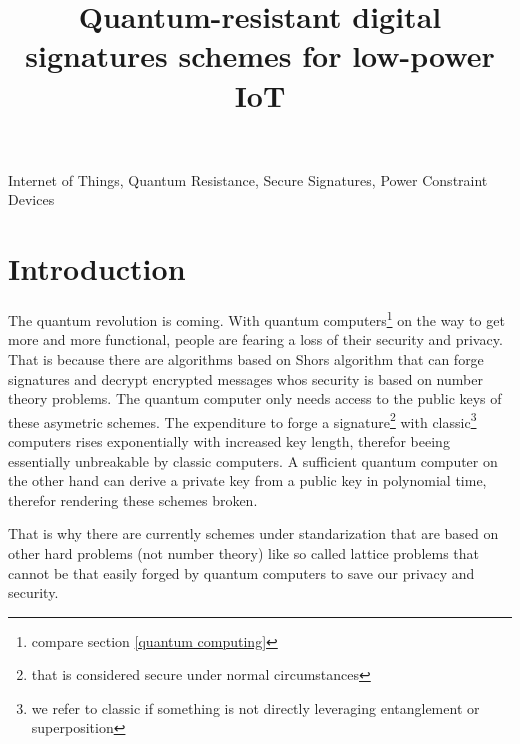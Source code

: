 \documentclass[conference]{IEEEtran}
\begin{document}
\title{Quantum-resistant digital signatures schemes for low-power IoT}

\author{
}

\maketitle

\begin{abstract}
\end{abstract}

\begin{IEEEkeywords}
Internet of Things, Quantum Resistance, Secure Signatures, Power Constraint Devices
\end{IEEEkeywords}


\section{Introduction}
The quantum revolution is coming. With quantum computers\footnote{compare section \ref{quantum computing}} on the way to get more and more functional, people are fearing a loss of their security and privacy.
That is because there are algorithms based on Shors algorithm that can forge signatures and decrypt encrypted messages whos security is based on number theory problems.
The quantum computer only needs access to the public keys of these asymetric schemes.
The expenditure to forge a signature\footnote{that is considered secure under normal circumstances 
} with classic\footnote{we refer to classic if something is not directly leveraging entanglement or superposition} computers rises exponentially with increased key length, therefor beeing essentially unbreakable by classic computers.
A sufficient quantum computer on the other hand can derive a private key from a public key in polynomial time, therefor rendering these schemes broken.

That is why there are currently schemes under standarization\cite{PQClean-GH} that are based on other hard problems (not number theory) like so called lattice problems that cannot be that easily forged by quantum computers to save our privacy and security.
\end{document}
